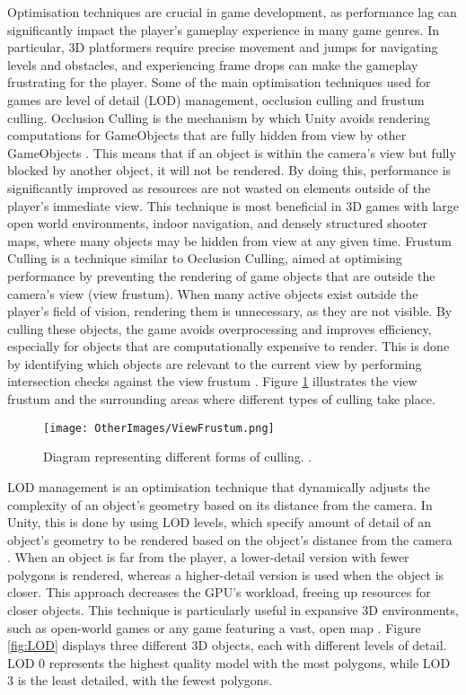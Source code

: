 \documentclass[10pt]{final_report}
\begin{document}
Optimisation techniques are crucial in game development, as performance lag can significantly impact the player's gameplay experience in many game genres. In particular, 3D platformers require precise movement and jumps for navigating levels and obstacles, and experiencing frame drops can make the gameplay frustrating for the player. Some of the main optimisation techniques used for games are level of detail (LOD) management, occlusion culling and frustum culling. \newline
Occlusion Culling is the mechanism by which Unity avoids rendering computations for GameObjects that are fully hidden from view by other GameObjects \cite{Singh2022}. This means that if an object is within the camera's view but fully blocked by another object, it will not be rendered. By doing this, performance is significantly improved as resources are not wasted on elements outside of the player's immediate view. This technique is most beneficial in 3D games with large open world environments, indoor navigation, and densely structured shooter maps, where many objects may be hidden from view at any given time.
\newline
Frustum Culling is a technique similar to Occlusion Culling, aimed at optimising performance by preventing the rendering of game objects that are outside the camera's view (view frustum). When many active objects exist outside the player's field of vision, rendering them is unnecessary, as they are not visible. By culling these objects, the game avoids overprocessing and improves efficiency, especially for objects that are computationally expensive to render. This is done by identifying which objects are relevant to the current view by performing intersection checks against the view frustum \cite{FC2020}. \newline
Figure \ref{fig:FrustumCulling} illustrates the view frustum and the surrounding areas where different types of culling take place.

\begin{figure}[H]
    \centering
    \texttt{[image: OtherImages/ViewFrustum.png]}
    \caption{Diagram representing different forms of culling. \cite{FC2020}.}
    \label{fig:FrustumCulling}
\end{figure}

LOD management is an optimisation technique that dynamically adjusts the complexity of an object's geometry based on its distance from the camera. In Unity, this is done by using LOD levels, which specify amount of detail of an object’s geometry to be rendered based on the object’s distance from the camera \cite{Unity2024LOD}. When an object is far from the player, a lower-detail version with fewer polygons is rendered, whereas a higher-detail version is used when the object is closer. This approach decreases the GPU's workload, freeing up resources for closer objects. This technique is particularly useful in expansive 3D environments, such as open-world games or any game featuring a vast, open map \cite{IndieGamesDevel}. Figure \ref{fig:LOD} displays three different 3D objects, each with different levels of detail. LOD 0 represents the highest quality model with the most polygons, while LOD 3 is the least detailed, with the fewest polygons.
\end{document}
